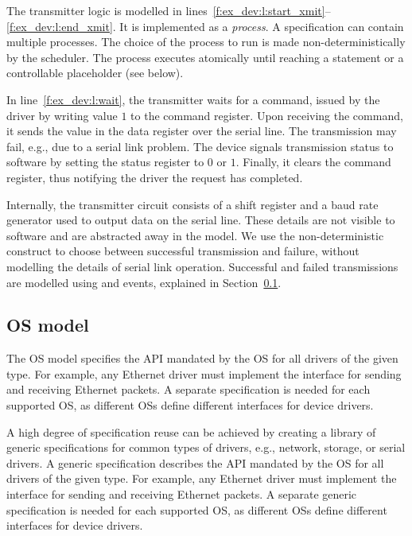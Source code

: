 The transmitter logic is modelled in lines~\ref{f:ex_dev:l:start_xmit}--\ref{f:ex_dev:l:end_xmit}.  It is implemented as a \tsl \emph{process}.  A \tsl specification can contain multiple processes.  The choice of the process to run is made non-deterministically by the scheduler.  The process executes atomically until reaching a  statement or a controllable placeholder (see below).

In line~\ref{f:ex_dev:l:wait}, the transmitter waits for a command, issued by the driver by writing value $1$ to the command register.  Upon receiving the command, it sends the value in the data register over the serial line.  The transmission may fail, e.g., due to a serial link problem.  The device signals transmission status to software by setting the status register to $0$ or $1$.  Finally, it clears the command register, thus notifying the driver the request has completed.

Internally, the transmitter circuit consists of a shift register and a baud rate generator used to output data on the serial line.  These details are not visible to software and are abstracted away in the model.  We use the non-deterministic  construct to choose between successful transmission and failure, without modelling the details of serial link operation.  Successful and failed transmissions are modelled using and  events, explained in Section~\ref{s:os}.

\subsection{OS model}\label{s:os}

The OS model specifies the API mandated by the OS for all drivers of the given type.  For example, any Ethernet driver must implement the interface for sending and receiving Ethernet packets.  A separate specification is needed for each supported OS, as different OSs define different interfaces for device drivers.

A high degree of specification reuse can be achieved by  creating a library of generic specifications for common types of drivers, e.g., network, storage, or serial drivers.  A generic specification describes the API mandated by the OS for all drivers of the given type.  For example, any Ethernet driver must implement the interface for sending and receiving Ethernet packets.  A separate generic specification is needed for each supported OS, as different OSs define different interfaces for device drivers.

